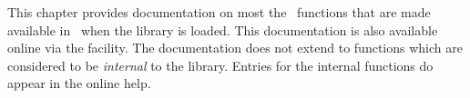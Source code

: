 \label{chap:ref}
This chapter provides documentation on most the \ML\ functions that are made
available in \HOL\ when the  library is loaded. This documentation
is also available online via the  facility.
The documentation does not extend to functions which are 
considered to be {\it internal\/} to the  library.
Entries for the internal functions do appear in the online help.
